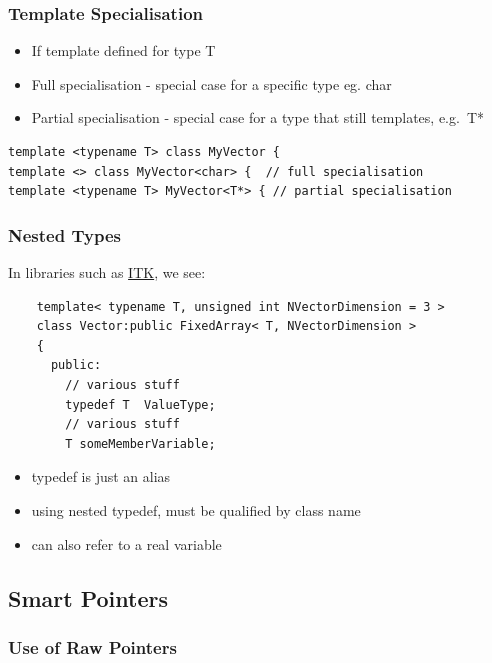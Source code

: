 \subsubsection{Template Specialisation}\label{template-specialisation}

\begin{itemize}
\itemsep1pt\parskip0pt
\item
  If template defined for type T
\item
  Full specialisation - special case for a specific type eg. char
\item
  Partial specialisation - special case for a type that still templates,
  e.g.~T*
\end{itemize}

\begin{verbatim}
template <typename T> class MyVector {
template <> class MyVector<char> {  // full specialisation
template <typename T> MyVector<T*> { // partial specialisation
\end{verbatim}

\subsubsection{Nested Types}\label{nested-types}

In libraries such as \href{http://www.itk.org}{ITK}, we see:

\begin{verbatim}
    template< typename T, unsigned int NVectorDimension = 3 >
    class Vector:public FixedArray< T, NVectorDimension >
    {
      public:
        // various stuff
        typedef T  ValueType;
        // various stuff
        T someMemberVariable;
\end{verbatim}

\begin{itemize}
\itemsep1pt\parskip0pt
\item
  typedef is just an alias
\item
  using nested typedef, must be qualified by class name
\item
  can also refer to a real variable
\end{itemize}

\subsection{Smart Pointers}\label{smart-pointers}

\subsubsection{Use of Raw Pointers}\label{use-of-raw-pointers}

